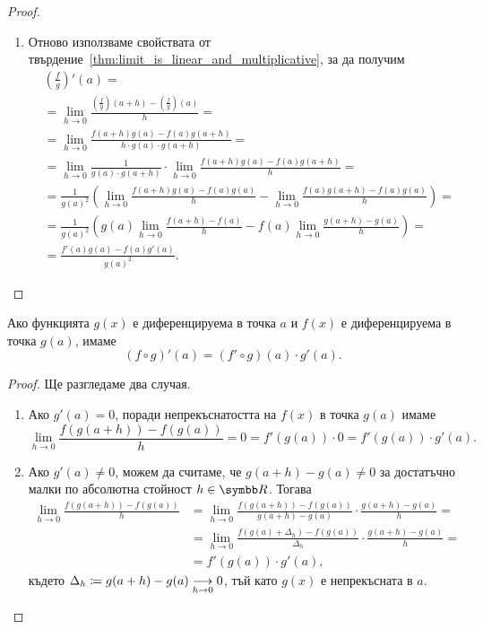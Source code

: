 \documentclass[numbers=endperiod, bibliography=totocnumbered]{scrartcl}
\begin{document}
\begin{proof}
\begin{enumerate}
    \item Отново използваме свойствата от твърдение~\ref{thm:limit_is_linear_and_multiplicative}, за да получим
    \begin{align*}
      &\left( \frac f g \right)'(a)
      = \\ &=
      \lim_{h \to 0} \frac {\left(\frac f g \right)(a+h) - \left(\frac f g \right)(a)} h
      = \\ &=
      \lim_{h \to 0} \frac {f(a+h) g(a) - f(a) g(a+h)} {h \cdot g(a) \cdot g(a+h)}
      = \\ &=
      \lim_{h \to 0} \frac 1 {g(a) \cdot g(a+h)} \cdot \lim_{h \to 0} \frac {f(a+h) g(a) - f(a) g(a+h)} h
      = \\ &=
      \frac 1 {{g(a)}^2} \left( \lim_{h \to 0} \frac {f(a+h) g(a) - f(a) g(a)} h - \lim_{h \to 0} \frac {f(a) g(a+h) - f(a) g(a)} h \right)
      = \\ &=
      \frac 1 {{g(a)}^2} \left( g(a) \lim_{h \to 0} \frac {f(a+h) - f(a)} h - f(a) \lim_{h \to 0} \frac {g(a+h) - g(a)} h \right)
      = \\ &=
      \frac {f'(a) g(a) - f(a) g'(a)} {{g(a)}^2}.
    \end{align*}
  \end{enumerate}
\end{proof}

\begin{theorem}\label{thm:chain_rule}
  Ако функцията \( g(x) \) е диференцируема в точка \( a \) и \( f(x) \) е диференцируема в точка \( g(a) \), имаме
  \begin{equation*}
    (f \circ g)'(a) = (f' \circ g)(a) \cdot g'(a).
  \end{equation*}
\end{theorem}
\begin{proof}
  Ще разгледаме два случая.

  \begin{enumerate}
    \item Ако \( g'(a) = 0 \), поради непрекъснатостта на \( f(x) \) в точка \( g(a) \) имаме
    \begin{equation*}
      \lim_{h \to 0} \frac {f(g(a+h)) - f(g(a))} h
      =
      0
      =
      f'(g(a)) \cdot 0
      =
      f'(g(a)) \cdot g'(a).
    \end{equation*}

    \item Ако \( g'(a) \neq 0 \), можем да считаме, че \( g(a+h) - g(a) \neq 0 \) за достатъчно малки по абсолютна стойност \( h \in \R \). Тогава
    \begin{align*}
      \lim_{h \to 0} \frac {f(g(a+h)) - f(g(a))} h
      &=
      \lim_{h \to 0} \frac {f(g(a+h)) - f(g(a))} {g(a+h) - g(a)} \cdot \frac {g(a+h) - g(a)} h
      = \\ &=
      \lim_{h \to 0} \frac {f(g(a) + \Delta_h) - f(g(a))} {\Delta_h} \cdot \frac {g(a+h) - g(a)} h
      = \\ &=
      f'(g(a)) \cdot g'(a),
    \end{align*}
    където \( \Delta_h \coloneqq g(a+h) - g(a) \Conv[h \to 0]{} 0 \), тъй като \( g(x) \) е непрекъсната в \( a \).
  \end{enumerate}
\end{proof}
\end{document}
